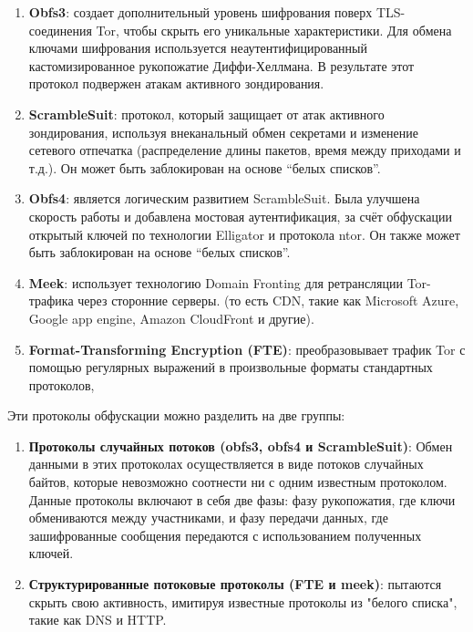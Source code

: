 \begin{enumerate}

    \item \textbf{Obfs3}: создает дополнительный уровень шифрования поверх TLS-соединения Tor, чтобы скрыть его уникальные характеристики.
    Для обмена ключами шифрования используется неаутентифицированный кастомизированное рукопожатие Диффи-Хеллмана.
    В результате этот протокол подвержен атакам активного зондирования.

    \item \textbf{ScrambleSuit}: протокол, который защищает от атак активного зондирования,
    используя внеканальный обмен секретами и изменение сетевого отпечатка
    (распределение длины пакетов, время между приходами и т.д.). Он может быть заблокирован на основе ``белых списков''.

    \item \textbf{Obfs4}: является логическим развитием ScrambleSuit.
    Была улучшена скорость работы и добавлена мостовая аутентификация,
    за счёт обфускации открытый ключей по технологии Elligator и протокола ntor.
    Он также может быть заблокирован на основе ``белых списков''.


    \item \textbf{Meek}: использует технологию Domain Fronting для ретрансляции Tor-трафика через сторонние серверы.
    (то есть CDN, такие как Microsoft Azure, Google app engine, Amazon CloudFront и другие).

    \item \textbf{Format-Transforming Encryption (FTE)}:
    преобразовывает трафик Tor с помощью регулярных выражений в произвольные форматы стандартных протоколов,


\end{enumerate}

Эти протоколы обфускации можно разделить на две группы:

\begin{enumerate}

    \item \textbf{Протоколы случайных потоков (obfs3, obfs4 и ScrambleSuit)}:
    Обмен данными в этих протоколах осуществляется в виде потоков случайных байтов,
    которые невозможно соотнести ни с одним известным протоколом.
    Данные протоколы включают в себя две фазы: фазу рукопожатия, где ключи обмениваются между участниками,
    и фазу передачи данных, где зашифрованные сообщения передаются с использованием полученных ключей.

    \item \textbf{Структурированные потоковые протоколы (FTE и meek)}:
    пытаются скрыть свою активность, имитируя известные протоколы из "белого списка", такие как DNS и HTTP.

\end{enumerate}

